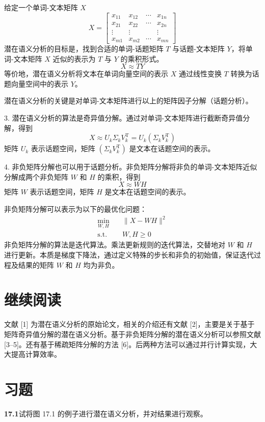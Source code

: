 \documentclass[UTF8,12pt,a4paper,fontset=fandol]{ctexart}
\begin{document}
给定一个单词-文本矩阵 $X$
\[
X=
\begin{bmatrix}
x_{11} & x_{12} & \cdots & x_{1n}\\
x_{21} & x_{22} & \cdots & x_{2n}\\
\vdots & \vdots & & \vdots\\
x_{m1} & x_{m2} & \cdots & x_{mn}
\end{bmatrix}
\]
潜在语义分析的目标是，找到合适的单词-话题矩阵 $T$ 与话题-文本矩阵 $Y$，将单词-文本矩阵 $X$ 近似的表示为 $T$ 与 $Y$ 的乘积形式。
\[
X\approx TY
\]
等价地，潜在语义分析将文本在单词向量空间的表示 $X$ 通过线性变换 $T$ 转换为话题向量空间中的表示 $Y$。

潜在语义分析的关键是对单词-文本矩阵进行以上的矩阵因子分解（话题分析）。

3. 潜在语义分析的算法是奇异值分解。通过对单词-文本矩阵进行截断奇异值分解，得到
\[
X\approx U_k\Sigma_kV_k^{\mathrm{T}}=U_k(\Sigma_kV_k^{\mathrm{T}})
\]
矩阵 $U_k$ 表示话题空间，矩阵 $(\Sigma_kV_k^{\mathrm{T}})$ 是文本在话题空间的表示。

4. 非负矩阵分解也可以用于话题分析。非负矩阵分解将非负的单词-文本矩阵近似分解成两个非负矩阵 $W$ 和 $H$ 的乘积，得到
\[
X\approx WH
\]
矩阵 $W$ 表示话题空间，矩阵 $H$ 是文本在话题空间的表示。

非负矩阵分解可以表示为以下的最优化问题：
\[
\begin{aligned}
\min_{W,H}\quad &\|X-WH\|^2\\
\text{s.t.}\quad &W,H\geqslant 0
\end{aligned}
\]
非负矩阵分解的算法是迭代算法。乘法更新规则的迭代算法，交替地对 $W$ 和 $H$ 进行更新。本质是梯度下降法，通过定义特殊的步长和非负的初始值，保证迭代过程及结果的矩阵 $W$ 和 $H$ 均为非负。

\section*{继续阅读}

文献 [1] 为潜在语义分析的原始论文，相关的介绍还有文献 [2]，主要是关于基于矩阵奇异值分解的潜在语义分析。基于非负矩阵分解的潜在语义分析可以参照文献 [3--5]。还有基于稀疏矩阵分解的方法 [6]。后两种方法可以通过并行计算实现，大大提高计算效率。

\section*{习题}

\noindent\textbf{17.1}\quad 试将图 17.1 的例子进行潜在语义分析，并对结果进行观察。
\end{document}
